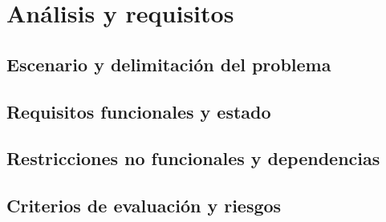 \chapter{Análisis y requisitos}
\label{cap:analisis}

\section{Escenario y delimitación del problema}
\label{sec:escenario}

\section{Requisitos funcionales y estado}
\label{sec:requisitos-funcionales}

\section{Restricciones no funcionales y dependencias}
\label{sec:restricciones}

\section{Criterios de evaluación y riesgos}
\label{sec:criterios}

